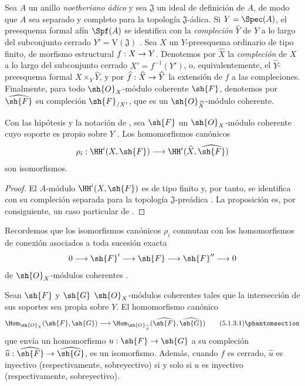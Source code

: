 \documentclass[oneside]{amsart}
\makeatletter
\newcommand{\ega@arrow}[2]{\mathchoice{#1}{#2}{#2}{#2}}
\renewcommand{\to}{\ega@arrow{\longrightarrow}{\rightarrow}}
\let\EGAOriginalLabel\label
\renewcommand{\label}[1]{\phantomsection\EGAOriginalLabel{#1}}
\makeatother
\begin{document}
\begin{env}[5.1.1]
\label{III.5.1.1}
Sea $A$ un anillo \emph{noetheriano ádico} y sea $\mathfrak{J}$ un ideal de
definición de $A$, de modo que $A$ sea separado y completo para la
topología $\mathfrak{J}$-ádica. Si $Y=\Spec(A)$, el preesquema formal
afín $\Spf(A)$ se identifica con la \emph{compleción}
$\widehat{Y}$ de $Y$ a lo largo del subconjunto cerrado
$Y'=\mathrm{V}(\mathfrak{J})$ . Sea $X$ un
$Y$-preesquema ordinario de tipo finito, de morfismo estructural
$f:X\to Y$. Denotemos por $\widehat{X}$ la \emph{compleción} de $X$ a lo largo
del subconjunto cerrado $X'=f^{-1}(Y')$, o, equivalentemente, el
$\widehat{Y}$-preesquema formal $X\times_Y\widehat{Y}$, y por
$\widehat{f}:\widehat{X}\to\widehat{Y}$ la extensión de $f$ a las
compleciones. Finalmente, para todo $\sh{O}_X$-módulo coherente
$\sh{F}$, denotemos por $\widehat{\sh{F}}$ su compleción
$\sh{F}_{/X'}$, que es un
$\sh{O}_{\widehat{X}}$-módulo coherente.
\end{env}

\begin{proposition}[5.1.2]
\label{III.5.1.2}
Con las hipótesis y la notación de , sea $\sh{F}$
un $\sh{O}_X$-módulo coherente cuyo soporte es propio sobre $Y$
. Los homomorfismos canónicos
\[
  \rho_i:
  \HH^i(X,\sh{F})
  \longrightarrow
  \HH^i(\widehat{X},\widehat{\sh{F}})
\]
son isomorfismos.
\end{proposition}

\begin{proof}
El $A$-módulo $\HH^i(X,\sh{F})$ es de tipo finito
 y, por tanto, se identifica con su compleción
separada para la topología $\mathfrak{J}$-preádica
. La proposición es, por consiguiente, un caso particular
de .
\end{proof}

Recordemos que los isomorfismos canónicos $\rho_i$ conmutan con los
homomorfismos de conexión asociados a toda sucesión exacta
\[
  0\longrightarrow\sh{F}'
  \longrightarrow\sh{F}
  \longrightarrow\sh{F}''
  \longrightarrow0
\]
de $\sh{O}_X$-módulos coherentes
 .

\begin{corollary}[5.1.3]
\label{III.5.1.3}
Sean $\sh{F}$ y $\sh{G}$ $\sh{O}_X$-módulos coherentes tales que
la intersección de sus soportes sea propia sobre $Y$. El
homomorfismo canónico
\[
  \Hom_{\sh{O}_X}(\sh{F},\sh{G})
  \longrightarrow
  \Hom_{\sh{O}_{\widehat{X}}}
  (\widehat{\sh{F}},\widehat{\sh{G}})
  \tag{5.1.3.1}
  \label{III.5.1.3.1.eq}
\]
que envía un homomorfismo $u:\sh{F}\to\sh{G}$ a su compleción
$\widehat{u}:\widehat{\sh{F}}\to\widehat{\sh{G}}$, es un
isomorfismo. Además, cuando $f$ es cerrado,
$\widehat{u}$ es inyectivo (\textup{respectivamente}, sobreyectivo) si y solo
si $u$ es inyectivo (respectivamente, sobreyectivo).
\end{corollary}
\end{document}
